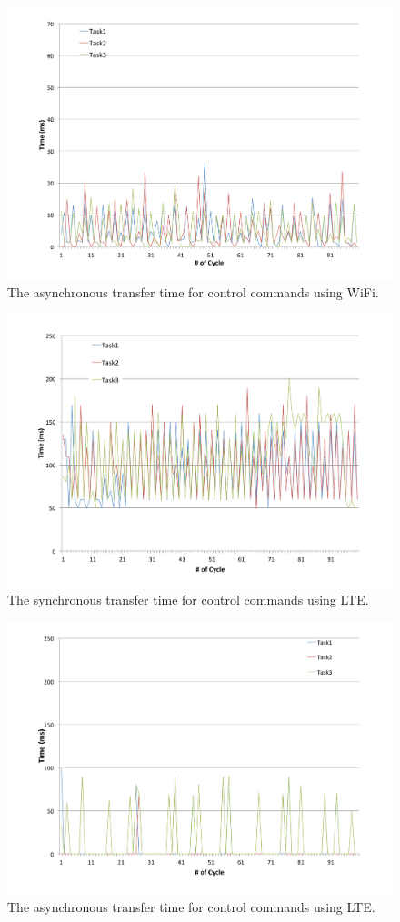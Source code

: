 \begin{figure}[!t]
 \centering
 \includegraphics[width=0.8\hsize]{fig/No4_Andrive_serv_cycle_WiFi_only_send.pdf}
 \caption{The asynchronous transfer time for control commands using WiFi.}
 \label{fig:no4}
\end{figure}

\begin{figure}[!t]
 \centering
 \includegraphics[width=0.8\hsize]{fig/No2_Andrive_serv_cycle_LTE.pdf}
 \caption{The synchronous transfer time for control commands using LTE.}
 \label{fig:no2}
\end{figure}

\begin{figure}[!t]
 \centering
 \includegraphics[width=0.8\hsize]{fig/No5_Andrive_serv_cycle_LTE_only_send.pdf}
 \caption{The asynchronous transfer time for control commands using LTE.}
 \label{fig:no5}
\end{figure}

